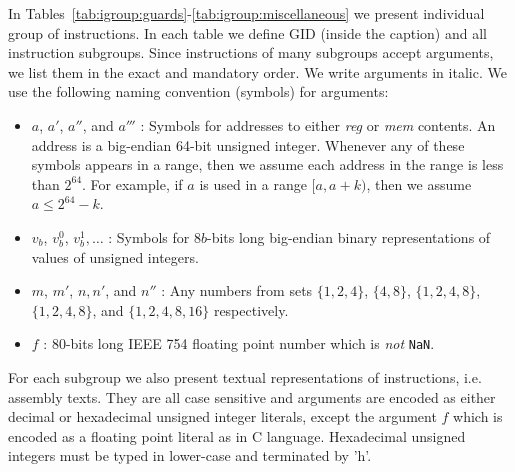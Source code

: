 \documentclass[10pt,twocolumn]{article}
\begin{document}
In Tables~\ref{tab:igroup:guards}-\ref{tab:igroup:miscellaneous} we present
individual group of instructions. In each table we define GID (inside the
caption) and all instruction subgroups. Since instructions of many subgroups
accept arguments, we list them in the exact and mandatory order. We write
arguments in italic. We use the following naming convention (symbols) for
arguments:
\begin{itemize}

\item $ a $, $ a' $, $ a'' $, and $ a''' $ : Symbols for addresses to either
\textit{reg} or \textit{mem} contents. An address is a big-endian 64-bit
unsigned integer. Whenever any of these symbols appears in a range, then we
assume each address in the range is less than $ 2^{64} $. For example, if $ a $
is used in a range $ [a,a+k) $, then we assume $ a \leq 2^{64}-k $.

\item $ v_{b} $,  $ v_{b}^0 $,  $ v_{b}^1, \ldots $ : Symbols for $ 8b $-bits
long big-endian binary representations of values of unsigned integers.

\item $ m $,  $ m' $, $ n, n' $, and $ n'' $ : Any numbers from sets $ \{ 1,2,4
\} $, $ \{ 4,8 \} $, $ \{ 1,2,4,8 \} $, $ \{ 1,2,4,8 \} $, and $ \{
1,2,4,8,16 \} $  respectively.

\item $ f $ : $ 80 $-bits long IEEE 754 floating point number which is
\emph{not} \texttt{NaN}.




\end{itemize}

For each subgroup we also present textual representations of instructions, i.e.
assembly texts. They are all case sensitive and arguments are encoded as either
decimal or hexadecimal unsigned integer literals, except the argument $ f $
which is encoded as a floating point literal as in C language. Hexadecimal
unsigned integers must be typed in lower-case and terminated by 'h'.
\end{document}
